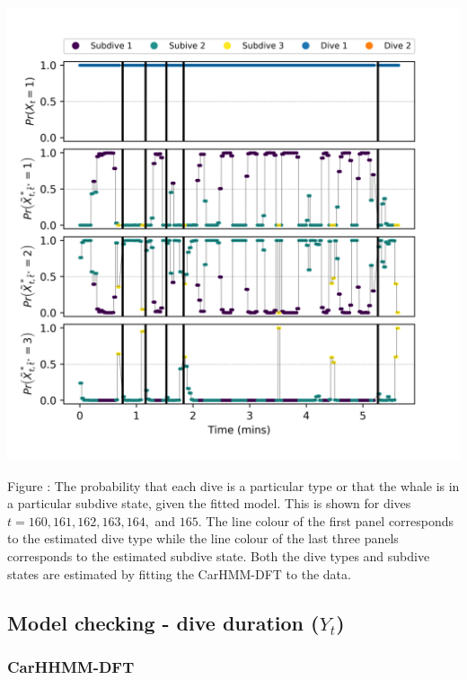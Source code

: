 \documentclass{article}
\begin{document}
        \begin{center}
        \includegraphics[width=6in]{../Plots/CarHMM_decoded_states.png}
        \end{center}
        
        \noindent Figure : The probability that each dive is a particular type or that the whale is in a particular subdive state, given the fitted model. This is shown for dives $t = 160,161,162,163,164,$ and $165$. The line colour of the first panel corresponds to the estimated dive type while the line colour of the last three panels corresponds to the estimated subdive state. Both the dive types and subdive states are estimated by fitting the CarHMM-DFT to the data.
        \addtocounter{fignum}{1}
        
    \newpage
    \subsection{Model checking - dive duration ($Y_t$)}
    
        \subsubsection{CarHHMM-DFT}
        
\end{document}
